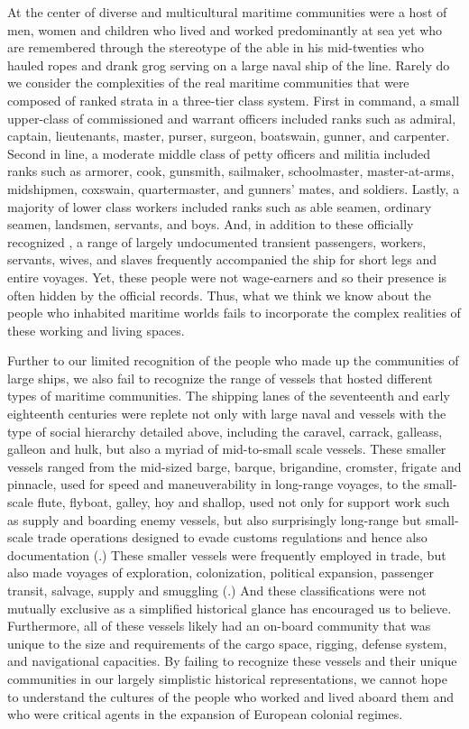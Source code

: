 At the center of diverse and multicultural maritime communities were a host of men, women and children who lived and worked predominantly at sea yet who are remembered through the stereotype of the able  in his mid-twenties who hauled ropes and drank grog serving on a large naval ship of the line. Rarely do we consider the complexities of the real maritime communities that were composed of ranked strata in a three-tier class system. First in command, a small upper-class of commissioned and warrant officers included ranks such as admiral, captain, lieutenants, master, purser, surgeon, boatswain, gunner, and carpenter. Second in line, a moderate middle class of petty officers and militia included ranks such as armorer, cook, gunsmith, sailmaker, schoolmaster, master-at-arms, midshipmen, coxswain, quartermaster, and gunners’ mates, and soldiers. Lastly, a majority of lower class workers included ranks such as able seamen, ordinary seamen, landsmen, servants, and boys. And, in addition to these officially recognized , a range of largely undocumented transient passengers, workers, servants, wives, and slaves frequently accompanied the ship for short legs and entire voyages. Yet, these people were not wage-earners and so their presence is often hidden by the official records. Thus, what we think we know about the people who inhabited maritime worlds fails to incorporate the complex realities of these working and living spaces.  



Further to our limited recognition of the people who made up the communities of large ships, we also fail to recognize the range of vessels that hosted different types of maritime communities. The shipping lanes of the seventeenth and early eighteenth centuries were replete not only with large naval and  vessels with the type of social hierarchy detailed above, including the caravel, carrack, galleass, galleon and hulk, but also a myriad of mid-to-small scale vessels. These smaller vessels ranged from the mid-sized barge, barque, brigandine, cromster, frigate and pinnacle, used for speed and maneuverability in long-range voyages, to the small-scale flute, flyboat, galley, hoy and shallop, used not only for support work such as supply and boarding enemy vessels, but also surprisingly long-range but small-scale trade operations designed to evade customs regulations and hence also documentation (\citealt{Bicheno2012}.) These smaller vessels were frequently employed in trade, but also made voyages of exploration, colonization, political expansion, passenger transit, salvage, supply and smuggling (\citealt{Jarvis2010}.) And these classifications were not mutually exclusive as a simplified historical glance has encouraged us to believe. Furthermore, all of these vessels likely had an on-board community that was unique to the size and requirements of the cargo space, rigging, defense system, and navigational capacities. By failing to recognize these vessels and their unique communities in our largely simplistic historical representations, we cannot hope to understand the cultures of the people who worked and lived aboard them and who were critical agents in the expansion of European colonial regimes. 



